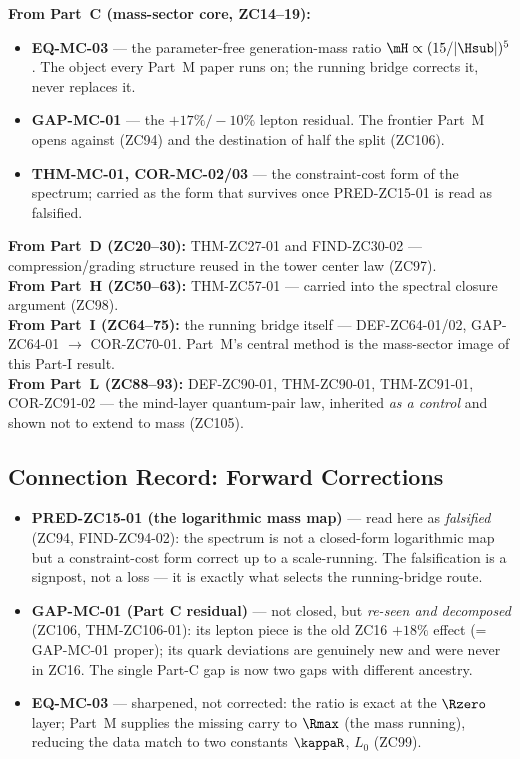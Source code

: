 \documentclass[12pt, a4paper]{article}
\begin{document}
\begin{inheritbox}[title={Pillars Part M inherits from Parts A--L}]
\sloppy
\textbf{From Part~C (mass-sector core, ZC14--19):}
\begin{itemize}[leftmargin=1.4em,itemsep=1pt]
\item \textbf{EQ-MC-03} --- the parameter-free generation-mass ratio
$\mH\propto(15/|\Hsub|)^{5}$. The object every Part~M paper runs on; the
running bridge corrects it, never replaces it.
\item \textbf{GAP-MC-01} --- the $+17\%/-10\%$ lepton residual. The frontier
Part~M opens against (ZC94) and the destination of half the split (ZC106).
\item \textbf{THM-MC-01, COR-MC-02/03} --- the constraint-cost form of the
spectrum; carried as the form that survives once PRED-ZC15-01 is read as
falsified.
\end{itemize}
\textbf{From Part~D (ZC20--30):} THM-ZC27-01 and FIND-ZC30-02 ---
compression/grading structure reused in the tower center law (ZC97).\\
\textbf{From Part~H (ZC50--63):} THM-ZC57-01 --- carried into the spectral
closure argument (ZC98).\\
\textbf{From Part~I (ZC64--75):} the running bridge itself ---
DEF-ZC64-01/02, GAP-ZC64-01 $\to$ COR-ZC70-01. Part~M's central method is
the mass-sector image of this Part-I result.\\
\textbf{From Part~L (ZC88--93):} DEF-ZC90-01, THM-ZC90-01, THM-ZC91-01,
COR-ZC91-02 --- the mind-layer quantum-pair law, inherited \emph{as a
control} and shown not to extend to mass (ZC105).
\end{inheritbox}

\subsection{Connection Record: Forward Corrections}

\begin{correctionbox}[title={Interpretations in Parts A--L that Part M refines}]
\sloppy
\begin{itemize}[leftmargin=1.4em,itemsep=2pt]
\item \textbf{PRED-ZC15-01 (the logarithmic mass map)} --- read here as
\emph{falsified} (ZC94, FIND-ZC94-02): the spectrum is not a closed-form
logarithmic map but a constraint-cost form correct up to a scale-running.
The falsification is a signpost, not a loss --- it is exactly what selects
the running-bridge route.
\item \textbf{GAP-MC-01 (Part C residual)} --- not closed, but
\emph{re-seen and decomposed} (ZC106, THM-ZC106-01): its lepton piece is the
old ZC16 $+18\%$ effect (= GAP-MC-01 proper); its quark deviations are
genuinely new and were never in ZC16. The single Part-C gap is now two
gaps with different ancestry.
\item \textbf{EQ-MC-03} --- sharpened, not corrected: the ratio is exact at
the $\Rzero$ layer; Part~M supplies the missing carry to $\Rmax$ (the mass
running), reducing the data match to two constants $\kappaR$, $L_0$ (ZC99).
\end{itemize}
\end{correctionbox}
\end{document}
